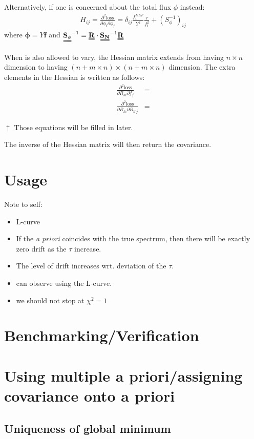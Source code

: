 \documentclass[a4paper, 12pt]{article}
\newcommand{\matr}[1]{\uuline{\bf{#1}}}
\newcommand{\ve}[1]{\boldsymbol{#1}}
\newcommand{\covarN}{\matr{S_N}^{-1}}
\newcommand{\apriori}[0]{\textit{a priori} }
\begin{document}
Alternatively, if one is concerned about the total flux $\phi$ instead:
\begin{align}
    H_{ij}=\frac{\partial^2 \text{loss}}{\partial \phi_i \partial \phi_j}= \delta_{ij} \frac{f^{DEF}_i}{Y^2} \frac{\tau}{f_i^2} + (S_{\phi}^{-1})_{ij}
\end{align}
where $\ve{\phi} = Y\ve{f}$ and $\matr{S_\phi}^{-1} = \matr{R}\cdot\covarN\matr{R}$

When \matr{R} is also allowed to vary, the Hessian matrix extends from having $n\times n$ dimension to having $(n+m\times n)\times(n+m\times n)$ dimension. The extra elements in the Hessian is written as follows:
\begin{align}
    \frac{\partial^2 \text{loss}}{\partial R_{ki} \partial f_j} &= \\
    \frac{\partial^2 \text{loss}}{\partial R_{ki} \partial R_{k'j}} &= 
\end{align}

$\uparrow$ Those equations will be filled in later.

The inverse of the Hessian matrix will then return the covariance.
\section{Usage}
Note to self:
\begin{itemize}
    \item L-curve
    \item If the \apriori coincides with the true spectrum, then there will be exactly zero drift as the $\tau$ increase.
    \item The level of drift increases wrt. deviation of the $\tau$.
    \item can observe using the L-curve.
    \item we should not stop at $\chi^2 =1$
\end{itemize}
\section{Benchmarking/Verification}

\section{Using multiple a priori/assigning covariance onto a priori}

\clearpage



\begin{appendices}
\section{Uniqueness of global minimum}\label{Global minimum}
\end{appendices}
\end{document}
